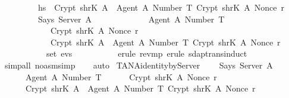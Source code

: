 \begin{isabellebody}
  \ \ \ \ \ \ \ \ \ h\isactrlsub s\ {\isacharequal}\ Crypt\ {\isacharparenleft}shrK\ A{\isacharparenright}\ {\isasymlbrace}\ {\isasymlbrace}Agent\ A{\isacharcomma}\ Number\ T{\isasymrbrace}{\isacharcomma}\ Crypt\ {\isacharparenleft}shrK\ A{\isacharparenright}\ {\isacharparenleft}Nonce\ r{\isacharparenright}{\isasymrbrace}\ {\isasymand}\isanewline
  \ \ \ \ \ \ \ \ \ Says\ Server\ A\ {\isasymlbrace}\isanewline
  \ \ \ \ \ \ \ \ \ \ \ \ {\isasymlbrace}Agent\ A{\isacharcomma}\ Number\ T{\isasymrbrace}{\isacharcomma}\isanewline
  \ \ \ \ \ \ \ \ \ \ \ \ Crypt\ {\isacharparenleft}shrK\ A{\isacharparenright}\ {\isacharparenleft}Nonce\ r{\isacharparenright}{\isacharcomma}\isanewline
  \ \ \ \ \ \ \ \ \ \ \ \ Crypt\ {\isacharparenleft}shrK\ A{\isacharparenright}\ {\isasymlbrace}\ {\isasymlbrace}Agent\ A{\isacharcomma}\ Number\ T{\isasymrbrace}{\isacharcomma}\ Crypt\ {\isacharparenleft}shrK\ A{\isacharparenright}\ {\isacharparenleft}Nonce\ r{\isacharparenright}\ {\isasymrbrace}\ \isanewline
  \ \ \ \ \ \ \ \ \ {\isasymrbrace}\ {\isasymin}\ set\ evs{\isachardoublequoteclose}\isanewline
  \isadelimproof
  \ \ \ \ \ \ \isanewline
  \ \ %
  \endisadelimproof
  \isatagproof
  \isamarkupfalse%
  \ {\isacharparenleft}erule\ rev{\isacharunderscore}mp{\isacharcomma}\ erule\ sdaptrans{\isachardot}induct{\isacharparenright}\isanewline
  \ \ \isamarkupfalse%
  \ {\isacharparenleft}simp{\isacharunderscore}all\ {\isacharparenleft}no{\isacharunderscore}asm{\isacharunderscore}simp{\isacharparenright}{\isacharparenright}\isanewline
  \ \ \isamarkupfalse%
  \ {\isacharparenleft}auto{\isacharparenright}\isanewline
  \isamarkupfalse%
  \endisatagproof
  {\isafoldproof}%
  \isadelimproof
  \isanewline
  \endisadelimproof
  \isanewline
  \isamarkupfalse%
  \ TAN{\isacharunderscore}A{\isacharunderscore}identity{\isacharunderscore}by{\isacharunderscore}Server\ {\isacharcolon}\isanewline
  \ \ {\isachardoublequoteopen}{\isasymlbrakk}\ Says\ Server\ A{\isacharprime}\ {\isasymlbrace}\isanewline
  \ \ \ \ \ \ {\isasymlbrace}Agent\ A{\isacharcomma}\ Number\ T{\isasymrbrace}{\isacharcomma}\isanewline
  \ \ \ \ \ \ Crypt\ {\isacharparenleft}shrK\ A{\isacharparenright}\ {\isacharparenleft}Nonce\ r{\isacharparenright}{\isacharcomma}\isanewline
  \ \ \ \ \ \ Crypt\ {\isacharparenleft}shrK\ A{\isacharparenright}\ {\isasymlbrace}\ {\isasymlbrace}Agent\ A{\isacharcomma}\ Number\ T{\isasymrbrace}{\isacharcomma}\ Crypt\ {\isacharparenleft}shrK\ A{\isacharparenright}\ {\isacharparenleft}Nonce\ r{\isacharparenright}\ {\isasymrbrace}\isanewline

\end{isabellebody}
